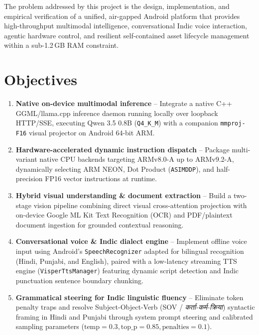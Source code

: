 \documentclass[11pt]{article}
\begin{document}
The problem addressed by this project is the design, implementation, and empirical verification
of a unified, air-gapped Android platform that provides high-throughput multimodal intelligence,
conversational Indic voice interaction, agentic hardware control, and resilient self-contained
asset lifecycle management within a sub-1.2\,GB RAM constraint.

\section{Objectives}
\begin{enumerate}[leftmargin=1.6em, itemsep=3pt]
    \item \textbf{Native on-device multimodal inference} -- Integrate a native C++ GGML/llama.cpp
    inference daemon running locally over loopback HTTP/SSE, executing Qwen 3.5 0.8B
    (\texttt{Q4\_K\_M}) with a companion \texttt{mmproj-F16} visual projector on Android 64-bit ARM.
    \item \textbf{Hardware-accelerated dynamic instruction dispatch} -- Package multi-variant
    native CPU backends targeting ARMv8.0-A up to ARMv9.2-A, dynamically selecting ARM NEON,
    Dot Product (\texttt{ASIMDDP}), and half-precision FP16 vector instructions at runtime.
    \item \textbf{Hybrid visual understanding \& document extraction} -- Build a two-stage vision
    pipeline combining direct visual cross-attention projection with on-device Google ML Kit Text
    Recognition (OCR) and PDF/plaintext document ingestion for grounded contextual reasoning.
    \item \textbf{Conversational voice \& Indic dialect engine} -- Implement offline voice input
    using Android's \texttt{SpeechRecognizer} adapted for bilingual recognition (Hindi, Punjabi,
    and English), paired with a low-latency streaming TTS engine (\texttt{VisperTtsManager})
    featuring dynamic script detection and Indic punctuation sentence boundary chunking.
    \item \textbf{Grammatical steering for Indic linguistic fluency} -- Eliminate token penalty
    traps and resolve Subject-Object-Verb (SOV / \textit{कर्ता-कर्म-क्रिया}) syntactic framing
    in Hindi and Punjabi through system prompt steering and calibrated sampling parameters
    ($\mathrm{temp}=0.3, \mathrm{top\_p}=0.85, \mathrm{penalties}=0.1$).

\end{enumerate}
\end{document}
